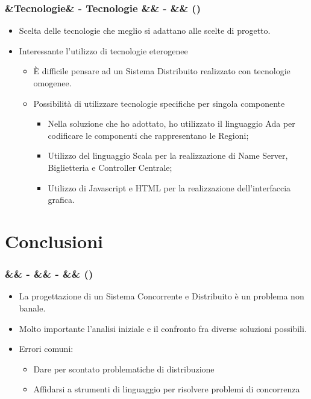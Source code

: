 \documentclass[slidestop,compress,blackandwhite]{beamer}
\newcommand{\cm}[1]{\vspace{#1cm}}
\newcommand{\newtitle}[4]{
	#1 
	\ifx&#2&%
	\else
  		\large- #2
	\fi
	\ifx&#3&%
	\else
  		\normalsize- #3
	\fi
	\ifx&#4&%
	\else
  		\normalsize (#4)
	\fi
}
\newcommand{\newframe}[5]{
	\begin{frame}
		\frametitle{\newtitle{#1}{#2}{#3}{#4}}
		#5
	\end{frame}
}
\newcommand{\myitemize}[1]{
	\begin{itemize}\itemsep4pt
	#1
	\end{itemize}
}
\begin{document}
	
	\newframe{}{Tecnologie}{}{}{
		\myitemize {
			\item Scelta delle tecnologie che meglio si adattano alle scelte di progetto.
			\item Interessante l'utilizzo di tecnologie eterogenee
				\myitemize {
					\item \`E difficile pensare ad un Sistema Distribuito realizzato con tecnologie omogenee.
					\item Possibilità di utilizzare tecnologie specifiche per singola componente
						\myitemize {
							\item Nella soluzione che ho adottato, ho utilizzato il linguaggio Ada per codificare le componenti che rappresentano le Regioni;
							\item Utilizzo del linguaggio Scala per la realizzazione di Name Server, Biglietteria e Controller Centrale;
							\item Utilizzo di Javascript e HTML per la realizzazione dell'interfaccia grafica.
						}
				}
		}
	}
\section{Conclusioni}\label{conclusions}
	
	\newframe{}{}{}{}{
		\cm{0.5}
		\myitemize {
			\item La progettazione di un Sistema Concorrente e Distribuito è un problema non banale.
			\item Molto importante l'analisi iniziale e il confronto fra diverse soluzioni possibili.
			\item Errori comuni:
				\myitemize {
					\item Dare per scontato problematiche di distribuzione
					\item Affidarsi a strumenti di linguaggio per risolvere problemi di concorrenza
				}
		}
	}
	
\end{document}
